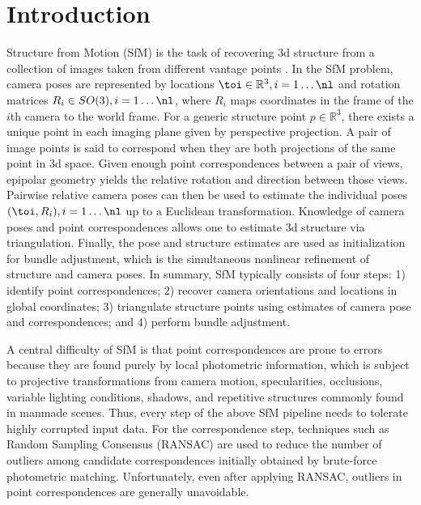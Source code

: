 \section{Introduction}
Structure from Motion (SfM) is the task of recovering 3d structure from a collection of images taken from different vantage points \cite{StefanosBook}.  In the SfM problem, camera poses are represented by locations $\toi \in \mathbb{R}^3, i = 1\ldots \nl$ and rotation matrices $R_i \in SO(3), i =1 \ldots \nl$, where $R_i$ maps coordinates in the frame of the $i$th camera to the world frame. For a generic structure point $p \in \mathbb{R}^3$, there exists a unique point in each imaging plane given by perspective projection.  A pair of image points is said to correspond when they are both projections of the same point in 3d space.
 Given enough point correspondences between a pair of views, epipolar geometry yields the relative rotation and direction between  those views. Pairwise relative camera poses can then be used to estimate the individual poses $(\toi, R_i), i=1\ldots \nl$ up to a Euclidean transformation. Knowledge of camera poses and point correspondences allows one to estimate 3d structure via triangulation. Finally, the pose and structure estimates are used as initialization for bundle adjustment, which is the simultaneous nonlinear refinement of structure and camera poses. In summary, SfM typically consists of four steps: 1) identify point correspondences; 2) recover camera orientations and locations in global coordinates; 3) triangulate structure points using estimates of camera pose and correspondences; and 4) perform bundle adjustment.

A central difficulty of SfM is that point correspondences are prone to errors because they are found purely by local photometric information, which is subject to projective transformations from camera motion, specularities, occlusions, variable lighting conditions, shadows, and repetitive structures commonly found in manmade scenes. Thus, every step of the above SfM pipeline  needs to  tolerate highly corrupted input data. For the correspondence step, techniques such as Random Sampling Consensus (RANSAC) are used to reduce the number of outliers among candidate correspondences initially obtained by brute-force photometric matching. Unfortunately, even after applying RANSAC, outliers in point correspondences are generally unavoidable. 

